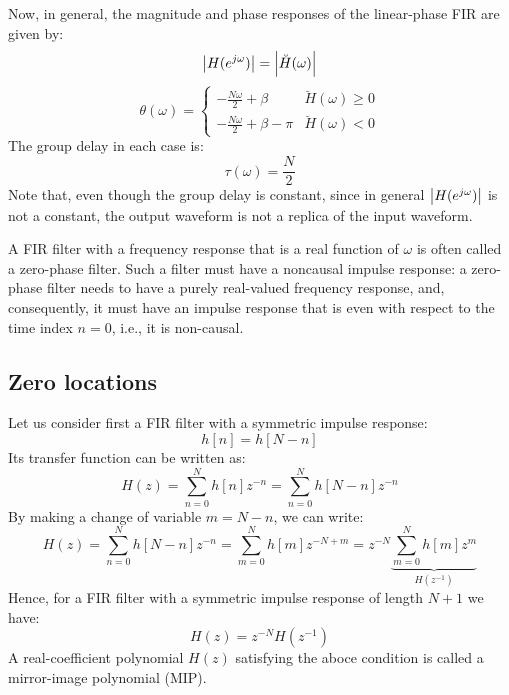 \documentclass[../../main/main.tex]{subfiles}
\begin{document}
Now, in general, the magnitude and phase responses of the linear-phase FIR are given by:
\begin{equation}
    \abs{H(e^{j\omega})}
    =
    \abs{\breve{H}(\omega)}
    \label{eq:L20_S41_1}
\end{equation}
\begin{equation}
    \theta(\omega)
    =
    \begin{cases}
        - \frac{N\omega}{2} + \beta         &   \breve{H}(\omega) \ge 0 \\
        - \frac{N\omega}{2} + \beta - \pi   &   \breve{H}(\omega) <   0
    \end{cases}
    \label{eq:L20_S41_2}
\end{equation}
The group delay in each case is:
\begin{equation}
    \tau(\omega)
    =
    \frac{N}{2}
    \label{eq:L20_S42_1}
\end{equation}
Note that, even though the group delay is constant, since in general \( \abs{H(e^{j\omega})} \) is not a constant, the output waveform is not a replica of the input waveform.

A FIR filter with a frequency response that is a real function of \( \omega \) is often called a zero-phase filter.
Such a filter must have a noncausal impulse response: a zero-phase filter needs to have a purely real-valued frequency response, and, consequently, it must have an impulse response that is even with respect to the time index \( n = 0 \), i.e., it is non-causal.



\subsection{Zero locations}
Let us consider first a FIR filter with a symmetric impulse response:
\begin{equation}
    h[n]
    =
    h[N-n]
    \label{eq:L20_S43_1}
\end{equation}
Its transfer function can be written as:
\begin{equation}
    H(z)
    =
    \sum_{n=0}^{N} h[n]z^{-n}
    =
    \sum_{n=0}^{N} h[N-n]z^{-n}
    \label{eq:L20_S43_2}
\end{equation}
By making a change of variable \( m = N - n \), we can write:
\begin{equation}
    H(z)
    =
    \sum_{n=0}^{N} h[N-n]z^{-n}
    =
    \sum_{m=0}^{N} h[m]z^{-N+m}
    =
    z^{-N} \underbrace{\sum_{m=0}^{N} h[m]z^{m}}_{H(z^{-1})}
    \label{eq:L20_S43_3}
\end{equation}
Hence, for a FIR filter with a symmetric impulse response of length \( N + 1 \) we have:
\begin{equation}
    H(z)
    =
    z^{-N} H(z^{-1})
    \label{eq:L20_S44_2}
\end{equation}
A real-coefficient polynomial \( H(z) \) satisfying the aboce condition is called a mirror-image polynomial (MIP).
\end{document}
